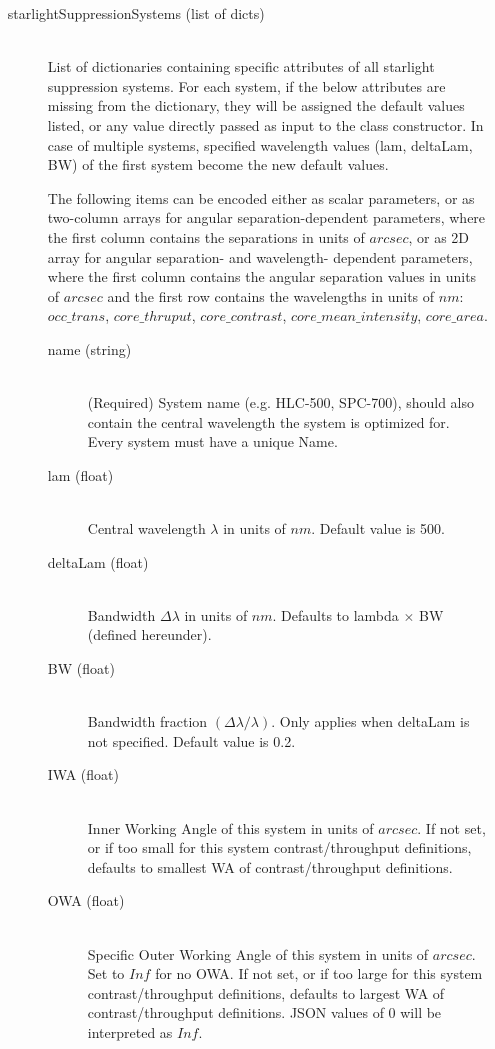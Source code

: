 \documentclass[cleanfoot]{asme2ej}
\begin{document}
\begin{itemize}
\begin{description}
\begin{description}
    \end{description}
    \item[starlightSuppressionSystems (list of dicts)] \hfill\\ List of dictionaries containing specific attributes of all starlight suppression systems. For each system, if the below attributes are missing from the dictionary, they will be assigned the default values listed, or any value directly passed as input to the class constructor. In case of multiple systems, specified wavelength values (lam, deltaLam, BW) of the first system become the new default values.
    
    The following items can be encoded either as scalar parameters, or as two-column arrays for angular separation-dependent parameters, where the first column contains the separations in units of $ arcsec $, or as 2D array for angular separation- and wavelength- dependent parameters, where the first column contains the angular separation values in units of $ arcsec $ and the first row contains the wavelengths in units of $ nm $: $occ\_trans$, $core\_thruput$, $core\_contrast$, $core\_mean\_intensity$, $core\_area$. 
    \begin{description}
        \item[name (string)] \hfill\\ (Required) System name (e.g. HLC-500, SPC-700), should also contain the central wavelength the system is optimized for. Every system must have a unique Name. 
        \item[lam (float)] \hfill \\ Central wavelength $\lambda$ in units of $ nm $. Default value is 500. 
        \item[deltaLam (float)] \hfill \\ Bandwidth $ \Delta\lambda $ in units of $ nm $. Defaults to lambda $ \times $ BW (defined hereunder).
        \item[BW (float)] \hfill \\ Bandwidth fraction $(\Delta\lambda/\lambda)$. Only applies when deltaLam is not specified. Default value is 0.2.
        \item[IWA (float)] \hfill \\ Inner Working Angle of this system in units of $ arcsec $. If not set, or if too small for this system contrast/throughput definitions, defaults to smallest WA of contrast/throughput definitions.
        \item[OWA (float)] \hfill \\ Specific Outer Working Angle of this system in units of $ arcsec $. Set to $ Inf $ for no OWA. If not set, or if too large for this system contrast/throughput definitions, defaults to largest WA of contrast/throughput definitions.  JSON values of $ 0 $ will be interpreted as $ Inf $.

\end{description}
\end{description}
\end{itemize}
\end{document}
